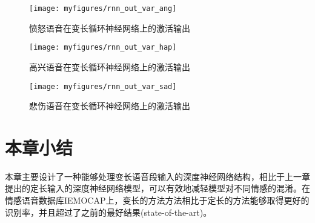\begin{figure}[h] %
    \vspace{-0cm}  %
    \setlength{\belowcaptionskip}{0cm}   %
    \centering
    \texttt{[image: myfigures/rnn\_out\_var\_ang]}
    \caption{愤怒语音在变长循环神经网络上的激活输出}
    \label{fig:rnn_out_ang}
\end{figure}

\begin{figure}[h] %
    \vspace{-0.8cm}  %
    \setlength{\belowcaptionskip}{0cm}   %
    \centering
    \texttt{[image: myfigures/rnn\_out\_var\_hap]}
    \caption{高兴语音在变长循环神经网络上的激活输出}
    \label{fig:rnn_out_hap}
\end{figure}

\begin{figure}[!tp] %
    \vspace{-0cm}  %
    \setlength{\belowcaptionskip}{0cm}   %
    \centering
    \texttt{[image: myfigures/rnn\_out\_var\_sad]}
    \caption{悲伤语音在变长循环神经网络上的激活输出}
    \label{fig:rnn_out_sad}
\end{figure}


\section{本章小结}
\label{sec:var_len_summary}

本章主要设计了一种能够处理变长语音段输入的深度神经网络结构，相比于上一章提出的定长输入的深度神经网络模型，可以有效地减轻模型对不同情感的混淆。在情感语音数据库IEMOCAP上，变长的方法方法相比于定长的方法能够取得更好的识别率，并且超过了之前的最好结果(state-of-the-art)。
